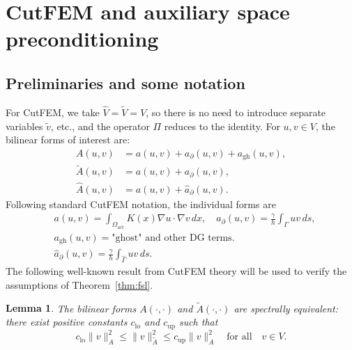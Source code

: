 \documentclass[11pt]{article}
\newtheorem{lemma}{Lemma}[section]
\theoremstyle{remark}
\begin{document}
\section{CutFEM and auxiliary space preconditioning}
\subsection{Preliminaries and some notation}
For CutFEM, we take $\widehat{V}=\widetilde{V}=V$, so there is no need to introduce separate variables $\widetilde{v}$, etc., and the operator $\Pi$ reduces to the identity.
For $u,v\in V$, the bilinear forms of interest are:
 \begin{equation}
  \begin{aligned}
  A(u,v)&=a(u,v)+a_\partial(u,v) +a_{\text{gh}}(u,v),\\
  \widetilde{A}(u,v)&=a(u,v)+a_\partial(u,v),\\
  \widehat{A}(u,v)&=a(u,v)+\widehat{a}_\partial(u,v).
  \end{aligned}
  \end{equation}
Following standard CutFEM notation, the individual forms are
\begin{equation}
  \begin{aligned}
&  a(u,v) = \int_{\Omega_\text{act}} K(x)\nabla u \cdot \nabla v\,dx, \quad
  a_\partial(u,v) = \frac{\gamma}{h}\int_{\Gamma} u v\,ds, \\
& a_{\text{gh}}(u,v) = \mbox{"ghost" and other DG terms}.\\
& \widehat{a}_\partial(u,v) = \frac{\gamma}{h}\int_{\widehat{\Gamma}} u v\,ds.
  \end{aligned}
\end{equation}
The following well-known result from CutFEM theory will be used to verify the assumptions of Theorem~\ref{thm:fsl}.
\begin{lemma}\label{lem:spectral-equivalence} 
The bilinear forms $A(\cdot,\cdot)$ and $\widetilde{A}(\cdot,\cdot)$ are spectrally equivalent: there exist positive constants $c_{\text{lo}}$ and $c_{\text{up}}$ such that
\begin{equation}
  \label{eq:spectral-equivalence}
  c_\text{lo}\|v\|_A^2 \le \|v\|_{\widetilde{A}}^2 \le c_\text{up}\|v\|_A^2 \quad \mbox{for all}\quad v \in V.
\end{equation}
\end{lemma}
\end{document}
